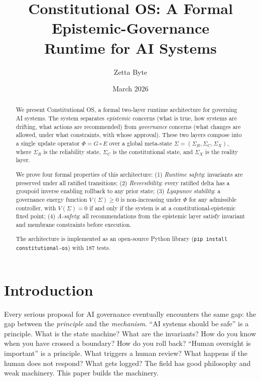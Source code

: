\documentclass[11pt]{article}
\title{\textbf{Constitutional OS: A Formal Epistemic-Governance\\
Runtime for AI Systems}}
\author[1]{Zetta Byte}
\affil[1]{Independent Researcher}
\date{March 2026}
\begin{document}
\maketitle

\begin{abstract}
We present Constitutional OS, a formal two-layer runtime architecture
for governing AI systems. The system separates \emph{epistemic}
concerns (what is true, how systems are drifting, what actions are
recommended) from \emph{governance} concerns (what changes are
allowed, under what constraints, with whose approval). These two
layers compose into a single update operator $\Phi = G \circ E$
over a global meta-state $\Sigma = (\Sigma_R, \Sigma_C, \Sigma_X)$,
where $\Sigma_R$ is the reliability state, $\Sigma_C$ is the
constitutional state, and $\Sigma_X$ is the reality layer.

We prove four formal properties of this architecture:
(1) \emph{Runtime safety}: invariants are preserved under all
ratified transitions;
(2) \emph{Reversibility}: every ratified delta has a groupoid
inverse enabling rollback to any prior state;
(3) \emph{Lyapunov stability}: a governance energy function
$V(\Sigma) \geq 0$ is non-increasing under $\Phi$ for any
admissible controller, with $V(\Sigma) = 0$ if and only if the
system is at a constitutional-epistemic fixed point;
(4) \emph{A-safety}: all recommendations from the epistemic layer
satisfy invariant and membrane constraints before execution.

The architecture is implemented as an open-source Python library
(\texttt{pip install constitutional-os}) with 187 tests.
\end{abstract}

\section{Introduction}
\label{sec:intro}

Every serious proposal for AI governance eventually encounters
the same gap: the gap between the \emph{principle} and the
\emph{mechanism}. ``AI systems should be safe'' is a principle.
What is the state machine? What are the invariants? How do you
know when you have crossed a boundary? How do you roll back?
``Human oversight is important'' is a principle. What triggers
a human review? What happens if the human does not respond?
What gets logged? The field has good philosophy and weak machinery.
This paper builds the machinery.
\end{document}
